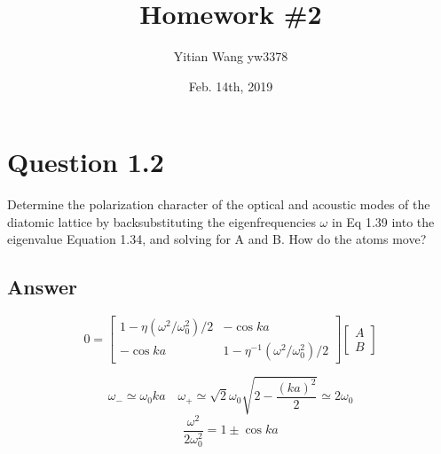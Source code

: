 \documentclass[
	12pt, %
]{fphw}
\title{Homework \#2} %
\author{Yitian Wang yw3378} %
\date{Feb. 14th, 2019} %
\institute{Columbia University} %
\begin{document}
\maketitle %


\section*{Question 1.2}

\begin{problem}
Determine the polarization character of the optical and acoustic modes
of the diatomic lattice by backsubstituting the eigenfrequencies $\omega$ in
Eq 1.39 into the eigenvalue Equation 1.34, and solving for A and B.
How do the atoms move?
\end{problem}


\subsection*{Answer}
\begin{equation}\label{1.36}
	0=\left[\begin{array}{cc}
	{1-\eta\left(\omega^{2} / \omega_{0}^{2}\right) / 2} & {-\cos k a} \\
	{-\cos k a} & {1-\eta^{-1}\left(\omega^{2} / \omega_{0}^{2}\right) / 2}
	\end{array}\right]\left[\begin{array}{c}
	{A} \\
	{B}
	\end{array}\right]
	\end{equation}

\begin{equation}\label{1.39}
	\omega_{-} \simeq \omega_{0} k a \quad \omega_{+} \simeq \sqrt{2} \omega_{0} \sqrt{2-\frac{(k a)^{2}}{2}} \simeq 2 \omega_{0}
\end{equation}
\begin{equation}\label{1.39origin}
	\frac{\omega^{2}}{2 \omega_{0}^{2}}=1 \pm \cos k a
	\end{equation}
\end{document}

